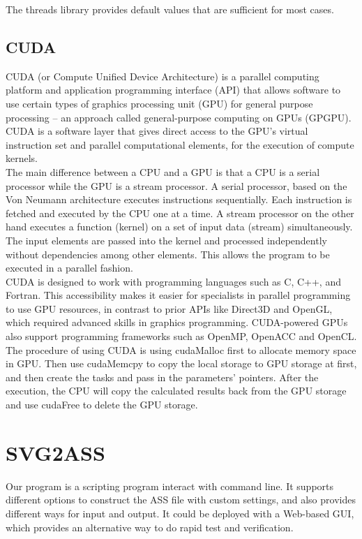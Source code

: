 \documentclass[10pt,twocolumn,letterpaper]{article}
\numberwithin{figure}{section}
\begin{document}
The threads library provides default values that are sufficient for most cases.


\subsection{CUDA}

CUDA (or Compute Unified Device Architecture) is a parallel computing platform and application programming interface (API) that allows software to use certain types of graphics processing unit (GPU) for general purpose processing – an approach called general-purpose computing on GPUs (GPGPU). CUDA is a software layer that gives direct access to the GPU's virtual instruction set and parallel computational elements, for the execution of compute kernels. \\
The main difference between a CPU and a GPU is that a CPU is a serial processor while the GPU is a stream processor. A serial processor, based on the Von Neumann architecture executes instructions sequentially. Each instruction is fetched and executed by the CPU one at a time. A stream processor on the other hand executes a function (kernel) on a set of input data (stream) simultaneously. The input elements are passed into the kernel and processed independently without dependencies among other elements. This allows the program to be executed in a parallel fashion.\\
CUDA is designed to work with programming languages such as C, C++, and Fortran. This accessibility makes it easier for specialists in parallel programming to use GPU resources, in contrast to prior APIs like Direct3D and OpenGL, which required advanced skills in graphics programming. CUDA-powered GPUs also support programming frameworks such as OpenMP, OpenACC and OpenCL.\\
The procedure of using CUDA is using cudaMalloc first to allocate memory space in GPU. Then use cudaMemcpy to copy the local storage to GPU storage at first, and then create the tasks and pass in the parameters' pointers. After the execution, the CPU will copy the calculated results back from the GPU storage and use cudaFree to delete the GPU storage.

\section{SVG2ASS}

Our program is a scripting program interact with command line. It supports different options to construct the ASS file with custom settings, and also provides different ways for input and output. It could be deployed with a Web-based GUI, which provides an alternative way to do rapid test and verification.
\end{document}
